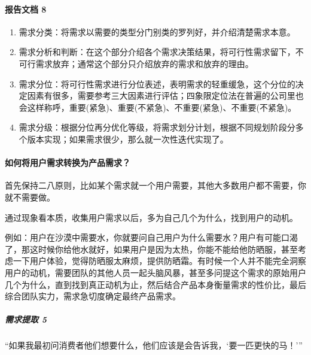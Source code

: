 \documentclass[letterpaper,11pt,english]{sphinxmanual}
\begin{document}
\paragraph{报告文档 8\sphinxfootnotemark[464]}
\label{\detokenize{chapter_knowledge/need_analysis:id2}}%
\begin{footnotetext}[464]\sphinxAtStartFootnote
{}
%
\end{footnotetext}\ignorespaces \begin{enumerate}
%
\item {} 
需求分类：将需求以需要的类型分门别类的罗列好，并介绍清楚需求本意。

\item {} 
需求分析和判断：在这个部分介绍各个需求决策结果，将可行性需求留下，不可行需求放弃；通常这个部分只介绍放弃的需求和放弃的理由。

\item {} 
需求分位：将可行性需求进行分位表述，表明需求的轻重缓急，这个分位的决定因素有很多，需要参考三大因素进行评估；四象限定位法在普遍的公司里也会这样称呼，重要(紧急)、重要(不紧急)、不重要(紧急)、不重要(不紧急)。

\item {} 
需求分级：根据分位再分优化等级，将需求划分计划，根据不同规划阶段分多个版本实现；如果需求很少，那么就一次性迭代实现了。

\end{enumerate}


\paragraph{如何将用户需求转换为产品需求？}
\label{\detokenize{chapter_knowledge/need_analysis:id3}}
首先保持二八原则，比如某个需求就一个用户需要，其他大多数用户都不需要，你就不需要做。

通过现象看本质，收集用户需求以后，多为自己几个为什么，找到用户的动机。

例如：用户在沙漠中需要水，你就要问自己用户为什么需要水？用户有可能口渴了，那这时候你给他水就好，如果用户是因为太热，你能不能给他防晒服，甚至考虑一下用户体验，觉得防晒服太麻烦，提供防晒霜。有时候一个人并不能完全洞察用户的动机，需要团队的其他人员一起头脑风暴，甚至多问提这个需求的原始用户几个为什么，直到找到真正动机为止，然后结合产品本身衡量需求的性价比，最后综合团队实力，需求急切度确定最终产品需求。


\subparagraph{需求提取 5\sphinxfootnotemark[465]}
\label{\detokenize{chapter_knowledge/need_analysis:id4}}%
\begin{footnotetext}[465]\sphinxAtStartFootnote
{}
%
\end{footnotetext}\ignorespaces 
“如果我最初问消费者他们想要什么，他们应该是会告诉我，‘要一匹更快的马！’”
\end{document}
